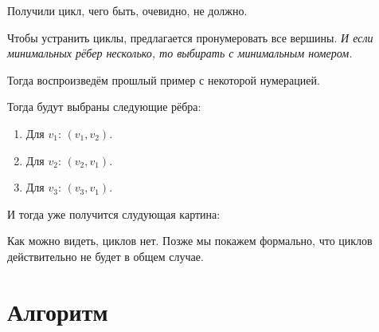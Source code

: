 Получили цикл, чего быть, очевидно, не должно.

Чтобы устранить циклы, предлагается пронумеровать все вершины. \textit{И если минимальных рёбер несколько, то выбирать с минимальным номером.}

Тогда воспроизведём прошлый пример с некоторой нумерацией.

\begin{figure}[H]
    \centering
\end{figure}

Тогда будут выбраны следующие рёбра:
\begin{enumerate}
    \item Для $v_1$: $(v_1, v_2)$.
    \item Для $v_2$: $(v_2, v_1)$.
    \item Для $v_3$: $(v_3, v_1)$.
\end{enumerate}
И тогда уже получится слудующая картина:

\begin{figure}[H]
    \centering
\end{figure}

Как можно видеть, циклов нет. Позже мы покажем формально, что циклов действительно не будет в общем случае.

\section{Алгоритм}

